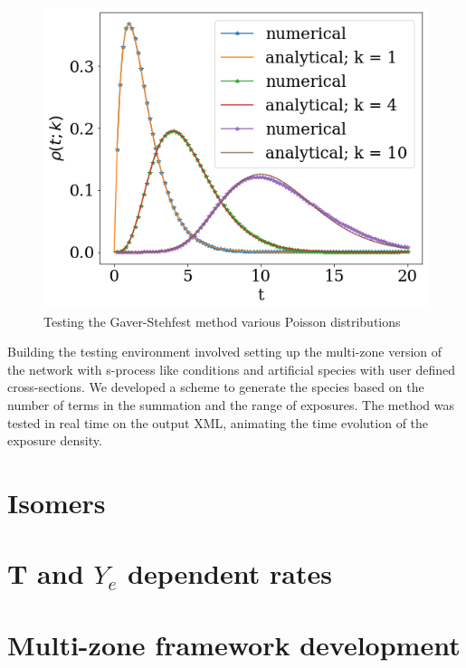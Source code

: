 \documentclass{article}
\begin{document}
\begin{figure}[!htp]
    \centerline{\includegraphics[scale = 0.5]{images/poisson_test.png}}
    \caption{Testing the Gaver-Stehfest method various Poisson distributions}
\end{figure}


Building the testing environment involved setting up the multi-zone version of the network with s-process like conditions and artificial 
species with user defined cross-sections. We developed a scheme to generate the species based on the number of terms in the summation 
and the range of exposures. The method was tested in real time on the output XML, animating the time evolution of the exposure density.

\section*{Isomers}
\section*{T and $Y_{e}$ dependent rates}
\section*{Multi-zone framework development}

\singlespacing



\end{document}
